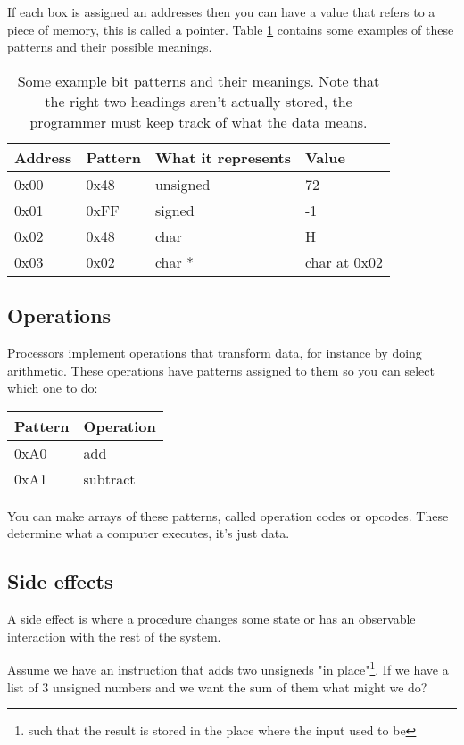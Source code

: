\documentclass{article}
\begin{document}
If each box is assigned an addresses then you can have a value that refers to a
piece of memory, this is called a pointer. Table \ref{pattern_examples} contains
some examples of these patterns and their possible meanings.
\begin{table}[h]
\centering
\begin{tabular}{| l | l || l | l |}
\hline
Address & Pattern & What it represents & Value \\
\hline
0x00 & 0x48 & unsigned & 72 \\
0x01 & 0xFF & signed & -1 \\
0x02 & 0x48 & char & H \\
0x03 & 0x02 & char * & char at 0x02 \\
\hline
\end{tabular}
\caption{Some example bit patterns and their meanings. Note that the right two
headings aren't actually stored, the programmer must keep track of what the
data means.}
\label{pattern_examples}
\end{table}

\subsection{Operations}
Processors implement operations that transform data, for instance by doing
arithmetic. These operations have patterns assigned to them so you can select
which one to do:
\begin{table}[h]
\centering
\begin{tabular}{| l | l |}
\hline
Pattern & Operation \\
\hline
0xA0 & add \\
0xA1 & subtract \\
\hline
\end{tabular}
\label{opcodes}
\end{table}

You can make arrays of these patterns, called operation codes or opcodes.
These determine what a computer executes, it's just data.

\subsection{Side effects}
A side effect is where a procedure changes some state or has an observable
interaction with the rest of the system.

Assume we have an instruction that adds two unsigneds "in place"\footnote{such
that the result is stored in the place where the input used to be}.
If we have a list of 3 unsigned numbers and we want the sum of them what might we do?
\end{document}
